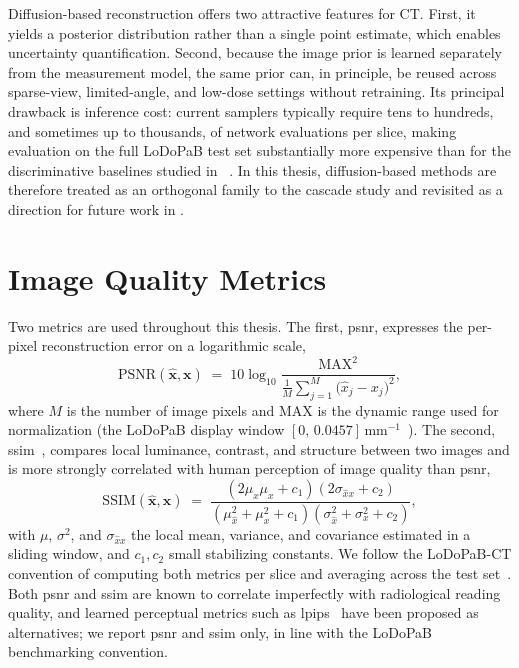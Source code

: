 Diffusion-based reconstruction offers two attractive features for CT. First, it yields a posterior distribution rather than a single point estimate, which enables uncertainty quantification. Second, because the image prior is learned separately from the measurement model, the same prior can, in principle, be reused across sparse-view, limited-angle, and low-dose settings without retraining. Its principal drawback is inference cost: current samplers typically require tens to hundreds, and sometimes up to thousands, of network evaluations per slice, making evaluation on the full LoDoPaB test set substantially more expensive than for the discriminative baselines studied in ~\cite{170,182}. In this thesis, diffusion-based methods are therefore treated as an orthogonal family to the cascade study and revisited as a direction for future work in .

\section{Image Quality Metrics}
\label{sec:bg_metrics}

Two metrics are used throughout this thesis. The first, \gls{psnr}, expresses the per-pixel reconstruction error on a logarithmic scale,
\begin{equation}
    \mathrm{PSNR}(\hat{\boldsymbol{x}},\boldsymbol{x})
    \;=\; 10 \log_{10}\!\frac{\mathrm{MAX}^{2}}{\frac{1}{M}\sum_{j=1}^{M}\bigl(\hat{x}_{j} - x_{j}\bigr)^{2}},
    \label{eq:psnr}
\end{equation}
where $M$ is the number of image pixels and $\mathrm{MAX}$ is the dynamic range used for normalization (the LoDoPaB display window
$[0,\,0.0457]\,\mathrm{mm}^{-1}$~\cite{Leuschner2021}). The second, \gls{ssim}~\cite{Wang2004}, compares local luminance, contrast, and structure between two images and is more strongly correlated with human perception of image quality than \gls{psnr},
\begin{equation}
    \mathrm{SSIM}(\hat{\boldsymbol{x}},\boldsymbol{x})
    \;=\; \frac{(2\mu_{\hat{x}}\mu_{x} + c_{1})(2\sigma_{\hat{x}x} + c_{2})}
              {(\mu_{\hat{x}}^{2} + \mu_{x}^{2} + c_{1})(\sigma_{\hat{x}}^{2} + \sigma_{x}^{2} + c_{2})},
    \label{eq:ssim}
\end{equation}
with $\mu$, $\sigma^{2}$, and $\sigma_{\hat{x}x}$ the local mean, variance, and covariance estimated in a sliding window, and $c_{1}, c_{2}$ small stabilizing constants.
We follow the LoDoPaB-CT convention of computing both metrics per slice and averaging across the test set~\cite{Leuschner2021, Kiss2024}.  Both \gls{psnr} and \gls{ssim}
are known to correlate imperfectly with radiological reading quality, and learned perceptual metrics such as \gls{lpips}~\cite{Zhang2018LPIPS} have been proposed as alternatives; we report \gls{psnr} and \gls{ssim} only, in line with the LoDoPaB benchmarking convention.

